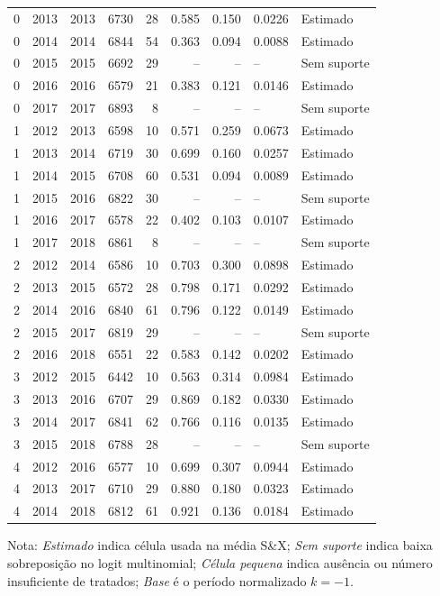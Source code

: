 \begin{longtable}{rrrrrrrll}
0 & 2013 & 2013 & 6730 & 28 & 0.585 & 0.150 & 0.0226 & Estimado \\
0 & 2014 & 2014 & 6844 & 54 & 0.363 & 0.094 & 0.0088 & Estimado \\
0 & 2015 & 2015 & 6692 & 29 & -- & -- & -- & Sem suporte \\
0 & 2016 & 2016 & 6579 & 21 & 0.383 & 0.121 & 0.0146 & Estimado \\
0 & 2017 & 2017 & 6893 & 8 & -- & -- & -- & Sem suporte \\
1 & 2012 & 2013 & 6598 & 10 & 0.571 & 0.259 & 0.0673 & Estimado \\
1 & 2013 & 2014 & 6719 & 30 & 0.699 & 0.160 & 0.0257 & Estimado \\
1 & 2014 & 2015 & 6708 & 60 & 0.531 & 0.094 & 0.0089 & Estimado \\
1 & 2015 & 2016 & 6822 & 30 & -- & -- & -- & Sem suporte \\
1 & 2016 & 2017 & 6578 & 22 & 0.402 & 0.103 & 0.0107 & Estimado \\
1 & 2017 & 2018 & 6861 & 8 & -- & -- & -- & Sem suporte \\
2 & 2012 & 2014 & 6586 & 10 & 0.703 & 0.300 & 0.0898 & Estimado \\
2 & 2013 & 2015 & 6572 & 28 & 0.798 & 0.171 & 0.0292 & Estimado \\
2 & 2014 & 2016 & 6840 & 61 & 0.796 & 0.122 & 0.0149 & Estimado \\
2 & 2015 & 2017 & 6819 & 29 & -- & -- & -- & Sem suporte \\
2 & 2016 & 2018 & 6551 & 22 & 0.583 & 0.142 & 0.0202 & Estimado \\
3 & 2012 & 2015 & 6442 & 10 & 0.563 & 0.314 & 0.0984 & Estimado \\
3 & 2013 & 2016 & 6707 & 29 & 0.869 & 0.182 & 0.0330 & Estimado \\
3 & 2014 & 2017 & 6841 & 62 & 0.766 & 0.116 & 0.0135 & Estimado \\
3 & 2015 & 2018 & 6788 & 28 & -- & -- & -- & Sem suporte \\
4 & 2012 & 2016 & 6577 & 10 & 0.699 & 0.307 & 0.0944 & Estimado \\
4 & 2013 & 2017 & 6710 & 29 & 0.880 & 0.180 & 0.0323 & Estimado \\
4 & 2014 & 2018 & 6812 & 61 & 0.921 & 0.136 & 0.0184 & Estimado \\
\end{longtable}
\vspace{-0.35cm}
\noindent\footnotesize Nota: \textit{Estimado} indica célula usada na média S\&X; \textit{Sem suporte} indica baixa sobreposição no logit multinomial; \textit{Célula pequena} indica ausência ou número insuficiente de tratados; \textit{Base} é o período normalizado \(k=-1\).
\par\endgroup
